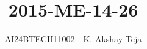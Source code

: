 \documentclass[journal,9pt,onecolumn]{IEEEtran}
\begin{document}

\vspace{3cm}
\title{2015-ME-14-26}
\author{AI24BTECH11002 - K. Akshay Teja}
\maketitle
 \bigskip
{\let\newpage\relax\maketitle}

\renewcommand{\thefigure}{\theenumi}
\renewcommand{\thetable}{\theenumi}
\setlength{\intextsep}{10pt} %

\renewcommand{\thetable}{\theenumi}
\end{document}
